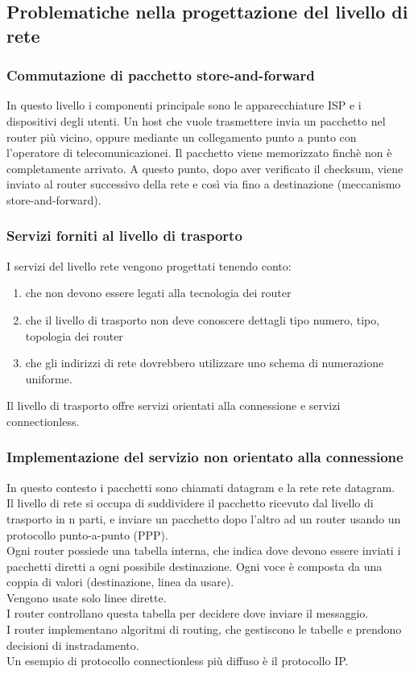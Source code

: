 \documentclass{article}
\begin{document}
\subsection{Problematiche nella progettazione del livello di rete}
\subsubsection{Commutazione di pacchetto store-and-forward}
In questo livello i componenti principale sono le apparecchiature ISP e i dispositivi degli utenti. Un host che vuole trasmettere invia un pacchetto nel router più vicino, oppure mediante un collegamento punto a punto con l'operatore di telecomunicazionei. Il pacchetto viene memorizzato finchè non è completamente arrivato. A questo punto, dopo aver verificato il checksum, viene inviato al router successivo della rete e così via fino a destinazione (meccanismo store-and-forward).
\subsubsection{Servizi forniti al livello di trasporto}
I servizi del livello rete vengono progettati tenendo conto:
\begin{enumerate}
    \item che non devono essere legati alla tecnologia dei router
    \item che il livello di trasporto non deve conoscere dettagli tipo numero, tipo, topologia dei router
    \item che gli indirizzi di rete dovrebbero utilizzare uno schema di numerazione uniforme.
\end{enumerate}
Il livello di trasporto offre servizi orientati alla connessione e servizi connectionless.
\subsubsection{Implementazione del servizio non orientato alla connessione}
In questo contesto i pacchetti sono chiamati datagram e la rete rete datagram. \\
Il livello di rete si occupa di suddividere il pacchetto ricevuto dal livello di trasporto in n parti, e inviare un pacchetto dopo l'altro ad un router usando un protocollo punto-a-punto (PPP). \\
Ogni router possiede una tabella interna, che indica dove devono essere inviati i pacchetti diretti a ogni possibile destinazione. Ogni voce è composta da una coppia di valori (destinazione, linea da usare). \\
Vengono usate solo linee dirette.\\
I router controllano questa tabella per decidere dove inviare il messaggio.\\
I router implementano algoritmi di routing, che gestiscono le tabelle e prendono decisioni di instradamento.\\
Un esempio di protocollo connectionless più diffuso è il protocollo IP.
\end{document}
